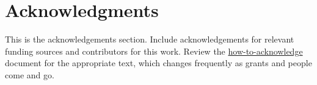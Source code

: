 \section*{Acknowledgments}

This is the acknowledgements section.
Include acknowledgements for relevant funding sources and contributors for
this work. Review the \href{https://drive.google.com/open?id=1VybV0oMPiqpInTwgO0ICq0EC4AL_fGj-zbXGJAhRiVU}{how-to-acknowledge}
document for the appropriate text, which changes frequently as grants and people
come and go.
